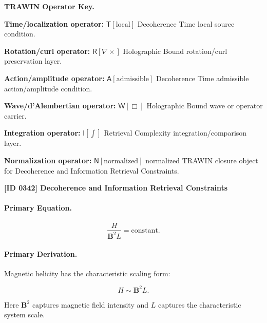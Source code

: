 \par\vspace{0.45\baselineskip}
\noindent\begin{minipage}[t]{\linewidth}
\begingroup
\small
\raggedright
\textbf{TRAWIN Operator Key.}\par
\noindent\textbf{Time/localization operator:} $\mathsf{T}\!\left[\mathrm{local}\right]$ Decoherence Time local source condition.\par
\noindent\textbf{Rotation/curl operator:} $\mathsf{R}\!\left[\nabla\times\right]$ Holographic Bound rotation/curl preservation layer.\par
\noindent\textbf{Action/amplitude operator:} $\mathsf{A}\!\left[\mathrm{admissible}\right]$ Decoherence Time admissible action/amplitude condition.\par
\noindent\textbf{Wave/d'Alembertian operator:} $\mathsf{W}\!\left[\Box\right]$ Holographic Bound wave or operator carrier.\par
\noindent\textbf{Integration operator:} $\mathsf{I}\!\left[\int\right]$ Retrieval Complexity integration/comparison layer.\par
\noindent\textbf{Normalization operator:} $\mathsf{N}\!\left[\mathrm{normalized}\right]$ normalized TRAWIN closure object for Decoherence and Information Retrieval Constraints.\par
\endgroup
\end{minipage}

\clearpage
\noindent\textbf{[ID 0342] Decoherence and Information Retrieval Constraints}\par
\vspace{0.35em}
\paragraph{Primary Equation.}
\begin{equation}
\frac{H}{\mathbf{B}^2 L}
=
\mathrm{constant}.
\end{equation}

\paragraph{Primary Derivation.}
Magnetic helicity has the characteristic scaling form:

\begin{equation}
H
\sim
\mathbf{B}^2 L .
\end{equation}

Here $\mathbf{B}^2$ captures magnetic field intensity and $L$ captures the characteristic system scale.

